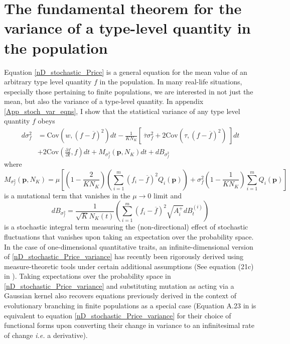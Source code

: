 \section{The fundamental theorem for the variance of a type-level quantity in the population}\label{sec_fun_theorems_var}
Equation \eqref{nD_stochastic_Price} is a general equation for the mean value of an arbitrary type level quantity $f$ in the population. In many real-life situations, especially those pertaining to finite populations, we are interested in not just the mean, but also the variance of a type-level quantity. In appendix \ref{App_stoch_var_eqns}, I show that the statistical variance of any type level quantity $f$ obeys
\begin{equation}
\label{nD_stochastic_Price_variance}
\begin{aligned}
d\sigma^2_{f} &= \textrm{Cov}\left(w,(f - \overline{f})^2\right)dt - \frac{1}{KN_K}\left[ \ \overline{\tau}\sigma^2_{f} +  2\textrm{Cov}\left(\tau,(f - \overline{f})^2\right) \ \right]dt\\[12pt]
& + 2\textrm{Cov}\left(\frac{\partial f}{\partial t},f\right)dt + M_{\sigma^2_f}(\mathbf{p},N_K)dt + dB_{\sigma^2_{f}}
\end{aligned}
\end{equation}
where
\begin{equation}
\label{variance_price_mutation_term}
M_{\sigma^2_f}(\mathbf{p},N_K) = \mu\left[\left(1 - \frac{2}{KN_K}\right)\left(\sum\limits_{i=1}^{m}(f_i - \overline{f})^2Q_i(\mathbf{p})\right) + \sigma^2_f\left(1 - \frac{1}{KN_K}\right)\sum\limits_{i=1}^{m}Q_i(\mathbf{p})\right]
\end{equation}
is a mutational term that vanishes in the $\mu \to 0$ limit and
\begin{equation}
\label{variance_price_diffusion_term}
dB_{\sigma^2_f} = \frac{1}{\sqrt{K}N_{K}(t)}\left(\sum\limits_{i=1}^{m}\left(f_i - \overline{f}\right)^2\sqrt{A_i^+}dB_{t}^{(i)}\right)
\end{equation}
is a stochastic integral term measuring the (non-directional) effect of stochastic fluctuations that vanishes upon taking an expectation over the probability space. In the case of one-dimensional quantitative traits, an infinite-dimensional version of \eqref{nD_stochastic_Price_variance} has recently been rigorously derived \citep{week_white_2021} using measure-theoretic tools under certain additional assumptions (See equation (21c) in \cite{week_white_2021}). Taking expectations over the probability space in \eqref{nD_stochastic_Price_variance} and substituting mutation as acting via a Gaussian kernel also recovers equations previously derived \citep{debarre_evolutionary_2016} in the context of evolutionary branching in finite populations as a special case (Equation A.23 in \cite{debarre_evolutionary_2016} is equivalent to equation \eqref{nD_stochastic_Price_variance} for their choice of functional forms upon converting their change in variance to an infinitesimal rate of change \emph{i.e.} a derivative).\\
